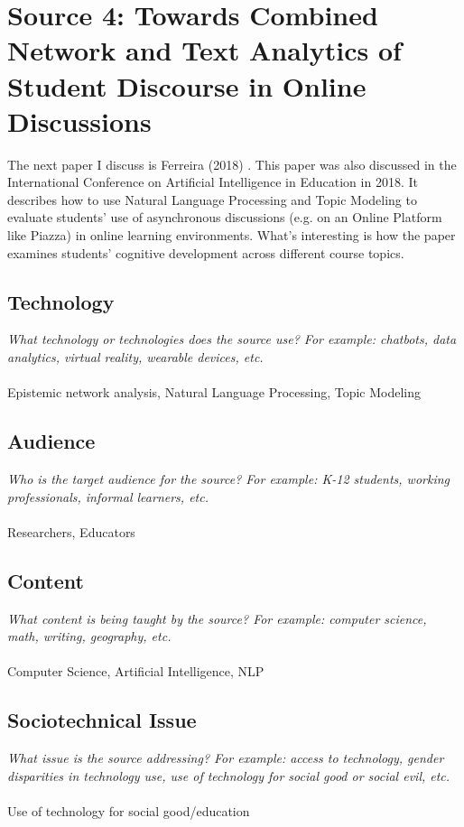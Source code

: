\documentclass[12pt, final]{article}
\begin{document}
\section{Source 4: Towards Combined Network and Text Analytics of Student Discourse in Online Discussions} \label{Source 4}
The next paper I discuss is Ferreira (2018) \cite{Ferreira}. This paper was also discussed in the International Conference on Artificial Intelligence in Education in 2018. It describes how to use Natural Language Processing and Topic Modeling to evaluate students' use of asynchronous discussions (e.g. on an Online Platform like Piazza) in online learning environments. What's interesting is how the paper examines students' cognitive development across different course topics. 

\subsection{Technology}
\textit{What technology or technologies does the source use? For example: chatbots, data analytics, virtual reality, wearable devices, etc.}
\\
\\
Epistemic network analysis, Natural Language Processing, Topic Modeling

\subsection{Audience}
\textit{Who is the target audience for the source? For example: K-12 students, working professionals, informal learners, etc.}
\\
\\
Researchers, Educators

\subsection{Content}
\textit{What content is being taught by the source? For example: computer science, math, writing, geography, etc.}
\\
\\
Computer Science, Artificial Intelligence, NLP

\subsection{Sociotechnical Issue}
\textit{What issue is the source addressing? For example: access to technology, gender disparities in technology use, use of technology for social good or social evil, etc.}
\\
\\
Use of technology for social good/education
\end{document}
